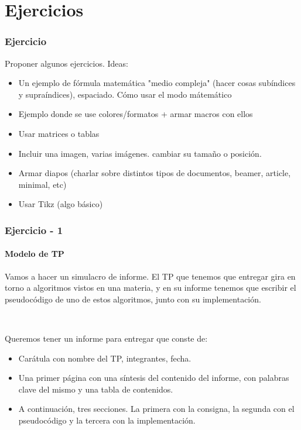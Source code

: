 \section{Ejercicios}\label{ejercicios}

\begin{frame}
\frametitle{Ejercicio}
\begin{center}

Proponer algunos ejercicios. Ideas:

\begin{itemize}
\item Un ejemplo de fórmula matemática "medio compleja" (hacer cosas subíndices y supraíndices), espaciado. Cómo usar el modo mátemático
\item Ejemplo donde se use colores/formatos + armar macros con ellos
\item Usar matrices o tablas
\item Incluir una imagen, varias imágenes. cambiar su tamaño o posición.
\item Armar diapos (charlar sobre distintos tipos de documentos, beamer, article, minimal, etc)
\item Usar Tikz (algo básico)
\end{itemize}

\end{center}
\end{frame}

\begin{frame}
\frametitle{Ejercicio - 1}
\framesubtitle{Modelo de TP}

Vamos a hacer un simulacro de informe. El TP que tenemos que entregar gira en torno a algoritmos vistos en una materia, y en su informe tenemos que escribir el pseudocódigo de uno de estos algoritmos, junto con su implementación. \pause

\

Queremos tener un informe para entregar que conste de:

\begin{itemize}
\item Carátula con nombre del TP, integrantes, fecha. \pause
\item Una primer página con una síntesis del contenido del informe, con palabras clave del mismo y una tabla de contenidos. \pause
\item A continuación, tres secciones. La primera con la consigna, la segunda con el pseudocódigo y la tercera con la implementación.
\end{itemize}

\end{frame}